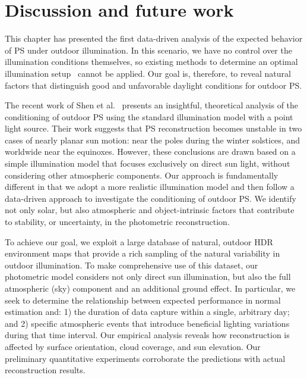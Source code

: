 \section{Discussion and future work}
\label{sec:3dv-discussion}
\label{sec:iccp-discussion}

This chapter has presented the first data-driven analysis of the expected behavior of PS under outdoor illumination\cite{Hold-Geoffroy-ICCP15,Hold-Geoffroy-3DV15}. In this scenario, we have no control over the illumination conditions themselves, so existing methods to determine an optimal illumination setup~\cite{drbohlav-iccv-05,klaudiny-prl-14} cannot be applied. Our goal is, therefore, to reveal natural factors that distinguish good and unfavorable daylight conditions for outdoor PS.

The recent work of Shen et al.~\cite{shen-pg-14} presents an insightful, theoretical analysis of the conditioning of outdoor PS using the standard illumination model with a point light source. Their work suggests that PS reconstruction becomes unstable in two cases of nearly planar sun motion: near the poles during the winter solstices, and worldwide near the equinoxes. However, these conclusions are drawn based on a simple illumination model that focuses exclusively on direct sun light, without considering other atmospheric components. Our approach is fundamentally different in that we adopt a more realistic illumination model and then follow a data-driven approach to investigate the conditioning of outdoor PS. We identify not only solar, but also atmospheric and object-intrinsic factors that contribute to stability, or uncertainty, in the photometric reconstruction.


To achieve our goal, we exploit a large database of natural, outdoor HDR environment maps that provide a rich sampling of the natural variability in outdoor illumination. To make comprehensive use of this dataset, our photometric model considers not only direct sun illumination, but also the full atmospheric (sky) component and an additional ground effect. In particular, we seek to determine the relationship between expected performance in normal estimation and: 1) the duration of data capture within a single, arbitrary day; and 2) specific atmospheric events that introduce beneficial lighting variations during that time interval. Our empirical analysis reveals how reconstruction is affected by surface orientation, cloud coverage, and sun elevation. Our preliminary quantitative experiments corroborate the predictions with actual reconstruction results.

